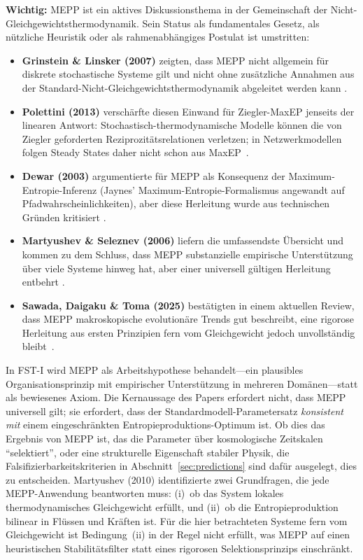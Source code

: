 \documentclass[12pt,a4paper]{article}
\theoremstyle{remark}
\begin{document}
\textbf{Wichtig:} MEPP ist ein aktives Diskussionsthema in der Gemeinschaft der Nicht-Gleichgewichtsthermodynamik. Sein Status als fundamentales Gesetz, als n\"utzliche Heuristik oder als rahmenabh\"angiges Postulat ist umstritten:

\begin{itemize}
    \item \textbf{Grinstein \& Linsker (2007)} zeigten, dass MEPP nicht allgemein f\"ur diskrete stochastische Systeme gilt und nicht ohne zus\"atzliche Annahmen aus der Standard-Nicht-Gleichgewichtsthermodynamik abgeleitet werden kann \citep{GrinsteinLinsker2007}.
    \item \textbf{Polettini (2013)} versch\"arfte diesen Einwand f\"ur Ziegler-MaxEP jenseits der linearen Antwort: Stochastisch-thermodynamische Modelle k\"onnen die von Ziegler geforderten Reziprozit\"atsrelationen verletzen; in Netzwerkmodellen folgen Steady States daher nicht schon aus MaxEP~\citep{Polettini2013}.
    \item \textbf{Dewar (2003)} argumentierte f\"ur MEPP als Konsequenz der Maximum-Entropie-Inferenz (Jaynes' Maximum-Entropie-Formalismus \citep{Jaynes1957} angewandt auf Pfadwahrscheinlichkeiten), aber diese Herleitung wurde aus technischen Gr\"unden kritisiert \citep{Dewar2003}.
    \item \textbf{Martyushev \& Seleznev (2006)} liefern die umfassendste \"Ubersicht und kommen zu dem Schluss, dass MEPP substanzielle empirische Unterst\"utzung \"uber viele Systeme hinweg hat, aber einer universell g\"ultigen Herleitung entbehrt \citep{MartyushevSeleznev2006}.
    \item \textbf{Sawada, Daigaku \& Toma (2025)} best\"atigten in einem aktuellen Review, dass MEPP makroskopische evolution\"are Trends gut beschreibt, eine rigorose Herleitung aus ersten Prinzipien fern vom Gleichgewicht jedoch unvollst\"andig bleibt~\citep{Sawada2025}.
\end{itemize}

In FST-I wird MEPP als Arbeitshypothese behandelt---ein plausibles Organisationsprinzip mit empirischer Unterst\"utzung in mehreren Dom\"anen---statt als bewiesenes Axiom. Die Kernaussage des Papers erfordert nicht, dass MEPP universell gilt; sie erfordert, dass der Standardmodell-Parametersatz \emph{konsistent mit} einem eingeschr\"ankten Entropieproduktions-Optimum ist. Ob dies das Ergebnis von MEPP ist, das die Parameter \"uber kosmologische Zeitskalen ``selektiert'', oder eine strukturelle Eigenschaft stabiler Physik, die Falsifizierbarkeitskriterien in Abschnitt~\ref{sec:predictions} sind daf\"ur ausgelegt, dies zu entscheiden. Martyushev (2010) \citep{Martyushev2010} identifizierte zwei Grundfragen, die jede MEPP-Anwendung beantworten muss: (i)~ob das System lokales thermodynamisches Gleichgewicht erf\"ullt, und (ii)~ob die Entropieproduktion bilinear in Fl\"ussen und Kr\"aften ist. F\"ur die hier betrachteten Systeme fern vom Gleichgewicht ist Bedingung~(ii) in der Regel nicht erf\"ullt, was MEPP auf einen heuristischen Stabilit\"atsfilter statt eines rigorosen Selektionsprinzips einschr\"ankt.
\end{document}
